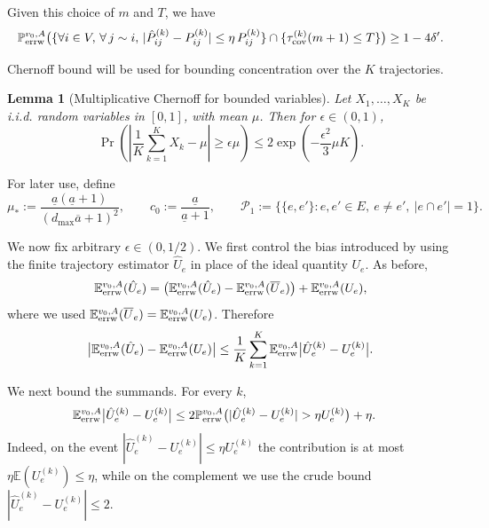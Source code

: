 \documentclass[a4paper, 11pt]{article}
\renewcommand{\P}{\mathbb{P}}
\newcommand{\E}{\mathbb{E}}
\newcommand{\Eerrw}{\E_{\textnormal{errw}}}
\newcommand{\Perrw}{\P_{\textnormal{errw}}}
\newcommand{\cov}{\textnormal{cov}}
\newtheorem{lem}[thm]{Lemma}
\begin{document}
Given this choice of $m$ and $T$, we have
\[\Perrw^{v_0,A} \bigl( \{\forall i\in V,\,\forall\,j\sim i,\, \lvert \hat{P}_{ij}^{(k)} - P_{ij}^{(k)}\rvert \le\eta \, P_{ij}^{(k)}\}\cap \{\tau_\cov^{(k)}(m+1)\leq T\}\bigr)\geq 1-4\delta'.\]


Chernoff bound will be used for bounding concentration over the $K$ trajectories. 
\medskip
\begin{lem}[Multiplicative Chernoff for bounded variables]
Let \(X_1,\dots,X_K\) be i.i.d. random variables in \([0,1]\), with mean \(\mu\). Then for \(\epsilon\in(0,1)\),
\[
\Pr\left(\left|\frac1K\sum_{k=1}^K X_k-\mu\right|\ge \epsilon\mu\right)
\le
2\exp\left(-\frac{\epsilon^2}{3}\mu K\right).
\]
\end{lem}

For later use, define
\[
\mu_*:=\frac{\underline a(\underline a+1)}{(d_{\max}\overline a+1)^2},
\qquad
c_0:=\frac{\underline a}{\underline a+1},
\qquad
\mathcal P_1:=\{\{e,e'\}:e,e'\in E,\ e\neq e',\ |e\cap e'|=1\}.
\]

We now fix arbitrary $\epsilon\in(0,1/2)$. We first control the bias introduced by
using the finite trajectory estimator $\hat U_e$ in place of the ideal quantity $U_e$.
As before,
\[
\Eerrw^{v_0,A}(\hat U_e)
=
\big(\Eerrw^{v_0,A}(\hat U_e)-\Eerrw^{v_0,A}(\overline U_e)\big)
+
\Eerrw^{v_0,A}(U_e),
\]
where we used $\Eerrw^{v_0,A}(\overline U_e)=\Eerrw^{v_0,A}(U_e)$. Therefore
\[
\big|\Eerrw^{v_0,A}(\hat U_e)-\Eerrw^{v_0,A}(U_e)\big|
\le
\frac1K\sum_{k=1}^K
\Eerrw^{v_0,A}\big|\hat U_e^{(k)}-U_e^{(k)}\big|.
\]

We next bound the summands. For every $k$,
\begin{align}
\label{eqn:errw-core7}
\Eerrw^{v_0,A}\big|\hat U_e^{(k)}-U_e^{(k)}\big|
&\le
2\Perrw^{v_0,A}\big(|\hat U_e^{(k)}-U_e^{(k)}|>\eta U_e^{(k)}\big)
+\eta.
\end{align}
Indeed, on the event
$|\hat U_e^{(k)}-U_e^{(k)}|\le \eta U_e^{(k)}$ the contribution is at most
$\eta\E(U_e^{(k)})\le\eta$, while on the complement we use the crude bound
$|\hat U_e^{(k)}-U_e^{(k)}|\le2$.
\end{document}
